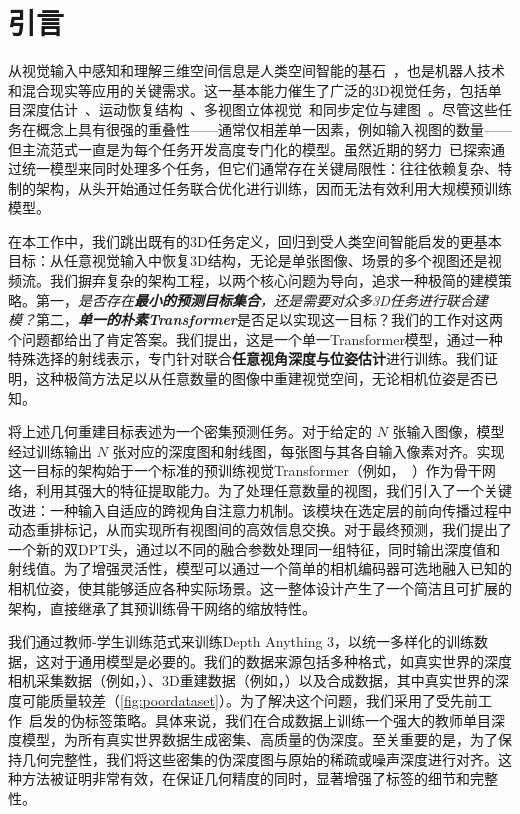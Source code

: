 
\section{引言}

从视觉输入中感知和理解三维空间信息是人类空间智能的基石~\citep{arterberry2000perception}，也是机器人技术和混合现实等应用的关键需求。这一基本能力催生了广泛的3D视觉任务，包括单目深度估计~\citep{eigen2014depth}、运动恢复结构~\citep{snavely2006photo}、多视图立体视觉~\citep{seitz2006comparison}和同步定位与建图~\citep{mur2015orb}。尽管这些任务在概念上具有很强的重叠性——通常仅相差单一因素，例如输入视图的数量——但主流范式一直是为每个任务开发高度专门化的模型。虽然近期的努力~\citep{wang2024dust3r,wang2025vggt}已探索通过统一模型来同时处理多个任务，但它们通常存在关键局限性：往往依赖复杂、特制的架构，从头开始通过任务联合优化进行训练，因而无法有效利用大规模预训练模型。

在本工作中，我们跳出既有的3D任务定义，回归到受人类空间智能启发的更基本目标：从任意视觉输入中恢复3D结构，无论是单张图像、场景的多个视图还是视频流。我们摒弃复杂的架构工程，以两个核心问题为导向，追求一种极简的建模策略。第一，\textit{是否存在\textbf{最小的预测目标集合}，还是需要对众多3D任务进行联合建模？}第二，\textit{\textbf{单一的朴素Transformer}}是否足以实现这一目标？我们的工作对这两个问题都给出了肯定答案。我们提出\paperfullname，这是一个单一Transformer模型，通过一种特殊选择的射线表示，专门针对联合\textbf{任意视角深度与位姿估计}进行训练。我们证明，这种极简方法足以从任意数量的图像中重建视觉空间，无论相机位姿是否已知。

\paperfullname 将上述几何重建目标表述为一个密集预测任务。对于给定的 $N$ 张输入图像，模型经过训练输出 $N$ 张对应的深度图和射线图，每张图与其各自输入像素对齐。实现这一目标的架构始于一个标准的预训练视觉Transformer（例如，~\citealt{oquab2023dinov2}）作为骨干网络，利用其强大的特征提取能力。为了处理任意数量的视图，我们引入了一个关键改进：一种输入自适应的跨视角自注意力机制。该模块在选定层的前向传播过程中动态重排标记，从而实现所有视图间的高效信息交换。对于最终预测，我们提出了一个新的双DPT头，通过以不同的融合参数处理同一组特征，同时输出深度值和射线值。为了增强灵活性，模型可以通过一个简单的相机编码器可选地融入已知的相机位姿，使其能够适应各种实际场景。这一整体设计产生了一个简洁且可扩展的架构，直接继承了其预训练骨干网络的缩放特性。

我们通过教师-学生训练范式来训练Depth Anything 3，以统一多样化的训练数据，这对于通用模型是必要的。我们的数据来源包括多种格式，如真实世界的深度相机采集数据（例如，\citealt{baruch2021arkitscenes}）、3D重建数据（例如，\citealt{reizenstein2021common}）以及合成数据，其中真实世界的深度可能质量较差（\cref{fig:poordataset}）。为了解决这个问题，我们采用了受先前工作~\citep{yang2024depth,yang2024depthv2}启发的伪标签策略。具体来说，我们在合成数据上训练一个强大的教师单目深度模型，为所有真实世界数据生成密集、高质量的伪深度。至关重要的是，为了保持几何完整性，我们将这些密集的伪深度图与原始的稀疏或噪声深度进行对齐。这种方法被证明非常有效，在保证几何精度的同时，显著增强了标签的细节和完整性。

